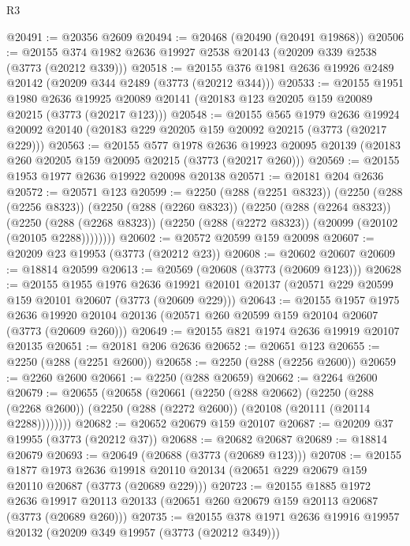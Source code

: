 \begin{lexlean}{R3}
\begin{coremodule}
@20491 := @20356 @2609
@20494 := @20468 (@20490 (@20491 @19868))
@20506 := @20155 @374 @1982 @2636 @19927 @2538 @20143 (@20209 @339 @2538 (@3773 (@20212 @339)))
@20518 := @20155 @376 @1981 @2636 @19926 @2489 @20142 (@20209 @344 @2489 (@3773 (@20212 @344)))
@20533 := @20155
    @1951
    @1980
    @2636
    @19925
    @20089
    @20141
    (@20183 @123 @20205 @159 @20089 @20215 (@3773 (@20217 @123)))
@20548 := @20155
    @565
    @1979
    @2636
    @19924
    @20092
    @20140
    (@20183 @229 @20205 @159 @20092 @20215 (@3773 (@20217 @229)))
@20563 := @20155
    @577
    @1978
    @2636
    @19923
    @20095
    @20139
    (@20183 @260 @20205 @159 @20095 @20215 (@3773 (@20217 @260)))
@20569 := @20155 @1953 @1977 @2636 @19922 @20098 @20138
@20571 := @20181 @204 @2636
@20572 := @20571 @123
@20599 := @2250
    (@288 (@2251 @8323))
    (@2250
      (@288 (@2256 @8323))
      (@2250
        (@288 (@2260 @8323))
        (@2250
          (@288 (@2264 @8323))
          (@2250
            (@288 (@2268 @8323))
            (@2250 (@288 (@2272 @8323)) (@20099 (@20102 (@20105 @2288))))))))
@20602 := @20572 @20599 @159 @20098
@20607 := @20209 @23 @19953 (@3773 (@20212 @23))
@20608 := @20602 @20607
@20609 := @18814 @20599
@20613 := @20569 (@20608 (@3773 (@20609 @123)))
@20628 := @20155
    @1955
    @1976
    @2636
    @19921
    @20101
    @20137
    (@20571 @229 @20599 @159 @20101 @20607 (@3773 (@20609 @229)))
@20643 := @20155
    @1957
    @1975
    @2636
    @19920
    @20104
    @20136
    (@20571 @260 @20599 @159 @20104 @20607 (@3773 (@20609 @260)))
@20649 := @20155 @821 @1974 @2636 @19919 @20107 @20135
@20651 := @20181 @206 @2636
@20652 := @20651 @123
@20655 := @2250 (@288 (@2251 @2600))
@20658 := @2250 (@288 (@2256 @2600))
@20659 := @2260 @2600
@20661 := @2250 (@288 @20659)
@20662 := @2264 @2600
@20679 := @20655
    (@20658
      (@20661
        (@2250
          (@288 @20662)
          (@2250
            (@288 (@2268 @2600))
            (@2250 (@288 (@2272 @2600)) (@20108 (@20111 (@20114 @2288))))))))
@20682 := @20652 @20679 @159 @20107
@20687 := @20209 @37 @19955 (@3773 (@20212 @37))
@20688 := @20682 @20687
@20689 := @18814 @20679
@20693 := @20649 (@20688 (@3773 (@20689 @123)))
@20708 := @20155
    @1877
    @1973
    @2636
    @19918
    @20110
    @20134
    (@20651 @229 @20679 @159 @20110 @20687 (@3773 (@20689 @229)))
@20723 := @20155
    @1885
    @1972
    @2636
    @19917
    @20113
    @20133
    (@20651 @260 @20679 @159 @20113 @20687 (@3773 (@20689 @260)))
@20735 := @20155 @378 @1971 @2636 @19916 @19957 @20132 (@20209 @349 @19957 (@3773 (@20212 @349)))

\end{coremodule}
\end{lexlean}
